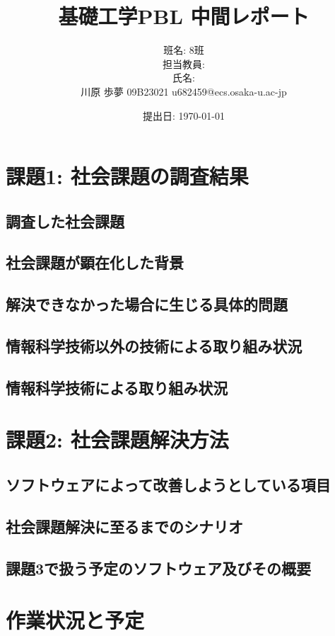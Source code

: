\documentclass[a4j, titlepage]{jarticle}
\title{基礎工学PBL 中間レポート}
\author{班名: 8班\\担当教員: \\氏名: \\ 川原 歩夢 09B23021 u682459@ecs.osaka-u.ac-jp}
\date{提出日: \today}
\begin{document}
\maketitle

\section{課題1: 社会課題の調査結果}
\subsection{調査した社会課題}

\subsection{社会課題が顕在化した背景}

\subsection{解決できなかった場合に生じる具体的問題}

\subsection{情報科学技術以外の技術による取り組み状況}

\subsection{情報科学技術による取り組み状況}

\section{課題2: 社会課題解決方法}
\subsection{ソフトウェアによって改善しようとしている項目}

\subsection{社会課題解決に至るまでのシナリオ}

\subsection{課題3で扱う予定のソフトウェア及びその概要}

\section{作業状況と予定}
\end{document}
